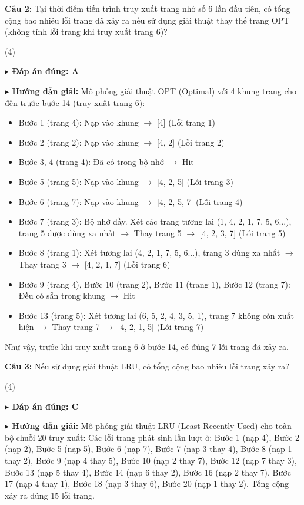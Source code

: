 \documentclass[11pt,a4paper]{article}
\newcommand{\giaithich}[2]{%
    \par\vspace{0.15cm}\noindent
    \begingroup\small
    \noindent\textbf{\color{blue}$\blacktriangleright$ Đáp án đúng: #1} \par\vspace{0.08cm}
    \noindent\textbf{\color{teal}$\blacktriangleright$ Hướng dẫn giải:} #2
    \endgroup\par\vspace{0.35cm}
}
\begin{document}
\noindent\textbf{Câu 2:} Tại thời điểm tiến trình truy xuất trang nhớ số 6 lần đầu tiên, có tổng cộng bao nhiêu lỗi trang đã xảy ra nếu sử dụng giải thuật thay thế trang OPT (không tính lỗi trang khi truy xuất trang 6)?
\begin{tasks}(4)
\end{tasks}
\giaithich{A}{Mô phỏng giải thuật OPT (Optimal) với 4 khung trang cho đến trước bước 14 (truy xuất trang 6):
\begin{itemize}[noitemsep,topsep=1pt]
    \item Bước 1 (trang 4): Nạp vào khung $\rightarrow$ [4] (Lỗi trang 1)
    \item Bước 2 (trang 2): Nạp vào khung $\rightarrow$ [4, 2] (Lỗi trang 2)
    \item Bước 3, 4 (trang 4): Đã có trong bộ nhớ $\rightarrow$ Hit
    \item Bước 5 (trang 5): Nạp vào khung $\rightarrow$ [4, 2, 5] (Lỗi trang 3)
    \item Bước 6 (trang 7): Nạp vào khung $\rightarrow$ [4, 2, 5, 7] (Lỗi trang 4)
    \item Bước 7 (trang 3): Bộ nhớ đầy. Xét các trang tương lai (1, 4, 2, 1, 7, 5, 6...), trang 5 được dùng xa nhất $\rightarrow$ Thay trang 5 $\rightarrow$ [4, 2, 3, 7] (Lỗi trang 5)
    \item Bước 8 (trang 1): Xét tương lai (4, 2, 1, 7, 5, 6...), trang 3 dùng xa nhất $\rightarrow$ Thay trang 3 $\rightarrow$ [4, 2, 1, 7] (Lỗi trang 6)
    \item Bước 9 (trang 4), Bước 10 (trang 2), Bước 11 (trang 1), Bước 12 (trang 7): Đều có sẵn trong khung $\rightarrow$ Hit
    \item Bước 13 (trang 5): Xét tương lai (6, 5, 2, 4, 3, 5, 1), trang 7 không còn xuất hiện $\rightarrow$ Thay trang 7 $\rightarrow$ [4, 2, 1, 5] (Lỗi trang 7)
\end{itemize}
Như vậy, trước khi truy xuất trang 6 ở bước 14, có đúng 7 lỗi trang đã xảy ra.}

\noindent\textbf{Câu 3:} Nếu sử dụng giải thuật LRU, có tổng cộng bao nhiêu lỗi trang xảy ra?
\begin{tasks}(4)
\end{tasks}
\giaithich{C}{Mô phỏng giải thuật LRU (Least Recently Used) cho toàn bộ chuỗi 20 truy xuất:
Các lỗi trang phát sinh lần lượt ở: Bước 1 (nạp 4), Bước 2 (nạp 2), Bước 5 (nạp 5), Bước 6 (nạp 7), Bước 7 (nạp 3 thay 4), Bước 8 (nạp 1 thay 2), Bước 9 (nạp 4 thay 5), Bước 10 (nạp 2 thay 7), Bước 12 (nạp 7 thay 3), Bước 13 (nạp 5 thay 4), Bước 14 (nạp 6 thay 2), Bước 16 (nạp 2 thay 7), Bước 17 (nạp 4 thay 1), Bước 18 (nạp 3 thay 6), Bước 20 (nạp 1 thay 2). Tổng cộng xảy ra đúng 15 lỗi trang.}
\end{document}
